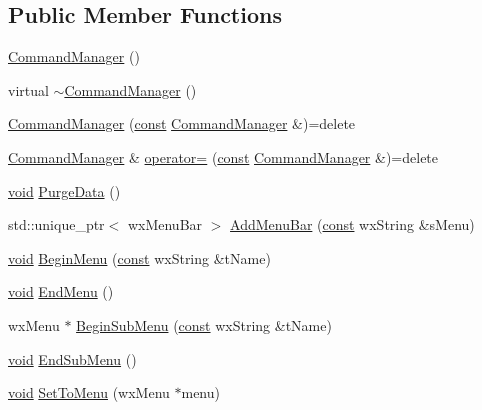 \subsection*{Public Member Functions}
\begin{DoxyCompactItemize}
\item 
\hyperlink{class_command_manager_a8a13226bf933396a3f35dfb5bee3e813}{Command\+Manager} ()
\item 
virtual \hyperlink{class_command_manager_ae6a6acf03e200dfc65a7a26fbbfd207d}{$\sim$\+Command\+Manager} ()
\item 
\hyperlink{class_command_manager_acc4ff7327a7e12beb9f79afd31da133a}{Command\+Manager} (\hyperlink{getopt1_8c_a2c212835823e3c54a8ab6d95c652660e}{const} \hyperlink{class_command_manager}{Command\+Manager} \&)=delete
\item 
\hyperlink{class_command_manager}{Command\+Manager} \& \hyperlink{class_command_manager_a7cc5f799535cca92735ecb9256e8ff17}{operator=} (\hyperlink{getopt1_8c_a2c212835823e3c54a8ab6d95c652660e}{const} \hyperlink{class_command_manager}{Command\+Manager} \&)=delete
\item 
\hyperlink{sound_8c_ae35f5844602719cf66324f4de2a658b3}{void} \hyperlink{class_command_manager_a347e934e6e632366e1a768ae01884c14}{Purge\+Data} ()
\item 
std\+::unique\+\_\+ptr$<$ wx\+Menu\+Bar $>$ \hyperlink{class_command_manager_af8b00106c1b6ee1c26384223beaec767}{Add\+Menu\+Bar} (\hyperlink{getopt1_8c_a2c212835823e3c54a8ab6d95c652660e}{const} wx\+String \&s\+Menu)
\item 
\hyperlink{sound_8c_ae35f5844602719cf66324f4de2a658b3}{void} \hyperlink{class_command_manager_a92c15ad84cc43e36b3dd03ab61974ef1}{Begin\+Menu} (\hyperlink{getopt1_8c_a2c212835823e3c54a8ab6d95c652660e}{const} wx\+String \&t\+Name)
\item 
\hyperlink{sound_8c_ae35f5844602719cf66324f4de2a658b3}{void} \hyperlink{class_command_manager_a78f74f30d7d892f0b59992410c12b336}{End\+Menu} ()
\item 
wx\+Menu $\ast$ \hyperlink{class_command_manager_a75f6546d2a619d16d4b36caaa4c85ce1}{Begin\+Sub\+Menu} (\hyperlink{getopt1_8c_a2c212835823e3c54a8ab6d95c652660e}{const} wx\+String \&t\+Name)
\item 
\hyperlink{sound_8c_ae35f5844602719cf66324f4de2a658b3}{void} \hyperlink{class_command_manager_a3221ddc22abafe531f928b0423bd8fd2}{End\+Sub\+Menu} ()
\item 
\hyperlink{sound_8c_ae35f5844602719cf66324f4de2a658b3}{void} \hyperlink{class_command_manager_aab6285b9aa370412d69319ae2f05ada3}{Set\+To\+Menu} (wx\+Menu $\ast$menu)

\end{DoxyCompactItemize}
